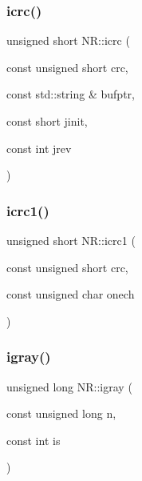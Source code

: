 \mbox{\label{namespaceNR_a05984f00dc053f5191e68179570e42f0}} 
\subsubsection{\texorpdfstring{icrc()}{icrc()}}
{\footnotesize\ttfamily unsigned short N\+R\+::icrc (\begin{DoxyParamCaption}\item[{const unsigned short}]{crc,  }\item[{const std\+::string \&}]{bufptr,  }\item[{const short}]{jinit,  }\item[{const int}]{jrev }\end{DoxyParamCaption})}

\mbox{\label{namespaceNR_a8eecd14f5dbacae9a1c719b3f8d5fe77}} 
\subsubsection{\texorpdfstring{icrc1()}{icrc1()}}
{\footnotesize\ttfamily unsigned short N\+R\+::icrc1 (\begin{DoxyParamCaption}\item[{const unsigned short}]{crc,  }\item[{const unsigned char}]{onech }\end{DoxyParamCaption})}

\mbox{\label{namespaceNR_a4965006048ac8b1e627c9e21b9d6c1f8}} 
\subsubsection{\texorpdfstring{igray()}{igray()}}
{\footnotesize\ttfamily unsigned long N\+R\+::igray (\begin{DoxyParamCaption}\item[{const unsigned long}]{n,  }\item[{const int}]{is }\end{DoxyParamCaption})}

\mbox{\label{namespaceNR_a16cc62d4d994e6557e4d85d1b5de0ff9}} 
